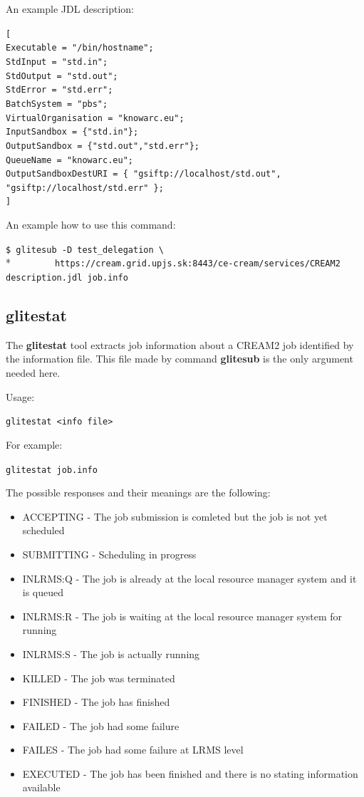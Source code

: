 \documentclass{article}
\begin{document}
An example JDL description:\\
\begin{minipage}{\textwidth}
\begin{framed}
\verb#[#\\
\verb#Executable = "/bin/hostname";#\\
\verb#StdInput = "std.in";#\\
\verb#StdOutput = "std.out";#\\
\verb#StdError = "std.err";#\\
\verb#BatchSystem = "pbs";#\\
\verb#VirtualOrganisation = "knowarc.eu";#\\
\verb#InputSandbox = {"std.in"};#\\
\verb#OutputSandbox = {"std.out","std.err"};#\\
\verb#QueueName = "knowarc.eu";#\\
\verb#OutputSandboxDestURI = { "gsiftp://localhost/std.out", "gsiftp://localhost/std.err" };#\\
\verb#]#
\end{framed}
\end{minipage}
An example how to use this command:
\begin{shaded}\verb#$ glitesub -D test_delegation \#\\*
\verb#        https://cream.grid.upjs.sk:8443/ce-cream/services/CREAM2 description.jdl job.info#\end{shaded}
\subsection{glitestat}
\label{glitestat}
The \textbf{glitestat} tool extracts job information about a CREAM2 job identified by the information file. This file made by command \textbf{glitesub} is the only argument needed here.\par
Usage:
\begin{shaded}\verb#glitestat <info file>#\end{shaded}
For example:
\begin{shaded}\verb#glitestat job.info#\end{shaded}
The possible responses and their meanings are the following:
\begin{itemize}
\item ACCEPTING - The job submission is comleted but the job is not yet scheduled
\item SUBMITTING - Scheduling in progress
\item INLRMS:Q - The job is already at the local resource manager system and it is queued
\item INLRMS:R - The job is waiting at the local resource manager system for running
\item INLRMS:S - The job is actually running
\item KILLED - The job was terminated
\item FINISHED - The job has finished
\item FAILED - The job had some failure
\item FAILES - The job had some failure at LRMS level
\item EXECUTED - The job has been finished and there is no stating information available
\end{itemize}
\end{document}
